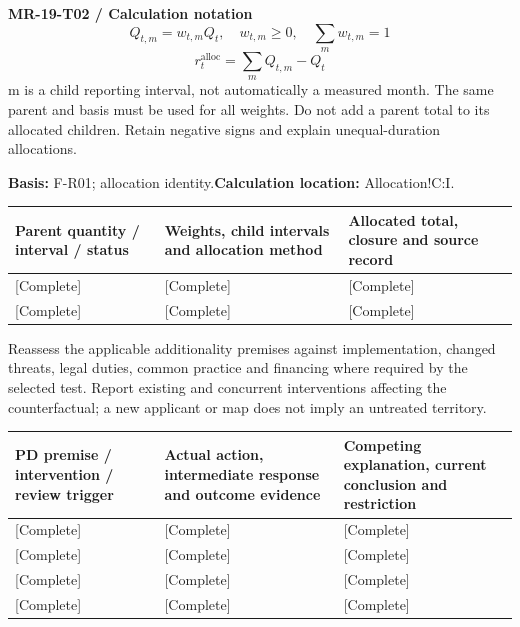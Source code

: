 \par\begingroup\sffamily\fontsize{8.4}{10.5}\selectfont\color{NEBGreen}
\textbf{MR-19-T02 / Calculation notation}\
{\fontsize{10}{12}\selectfont\[Q_{t,m}=w_{t,m}Q_t,\quad w_{t,m}\ge0,\quad \sum_m w_{t,m}=1\]}
{\fontsize{10}{12}\selectfont\[r_t^{\mathrm{alloc}}=\sum_m Q_{t,m}-Q_t\]}
m is a child reporting interval, not automatically a measured month. The same parent and basis must be used for all weights. Do not add a parent total to its allocated children. Retain negative signs and explain unequal-duration allocations.\par
\textbf{Basis:} F-R01; allocation identity.\quad\textbf{Calculation location:} Allocation!C:I.\par\endgroup
{\sffamily\fontsize{8.6}{10.7}\selectfont\begin{longtable}{@{}P{48mm}P{61mm}P{53mm}@{}}
\toprule
\textbf{Parent quantity / interval / status} & \textbf{Weights, child intervals and allocation method} & \textbf{Allocated total, closure and source record}\\\midrule\endhead
\rule{0pt}{8mm}[Complete] & [Complete] & [Complete]\\\hline
\rule{0pt}{8mm}[Complete] & [Complete] & [Complete]\\\hline
\end{longtable}}
Reassess the applicable additionality premises against implementation, changed threats, legal duties, common practice and financing where required by the selected test. Report existing and concurrent interventions affecting the counterfactual; a new applicant or map does not imply an untreated territory.\par
\BlockTitle{MR-20-T01 / Additionality continuation record}
{\sffamily\fontsize{8.6}{10.7}\selectfont\begin{longtable}{@{}P{48mm}P{61mm}P{53mm}@{}}
\toprule
\textbf{PD premise / intervention / review trigger} & \textbf{Actual action, intermediate response and outcome evidence} & \textbf{Competing explanation, current conclusion and restriction}\\\midrule\endhead
\rule{0pt}{8mm}[Complete] & [Complete] & [Complete]\\\hline
\rule{0pt}{8mm}[Complete] & [Complete] & [Complete]\\\hline
\rule{0pt}{8mm}[Complete] & [Complete] & [Complete]\\\hline
\rule{0pt}{8mm}[Complete] & [Complete] & [Complete]\\\hline
\end{longtable}}
